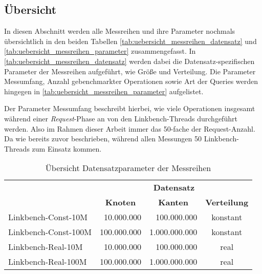 \subsection{Übersicht}
In diesen Abschnitt werden alle Messreihen und ihre Parameter nochmals übersichtlich in den beiden Tabellen \autoref{tab:uebersicht_messreihen_datensatz} und \autoref{tab:uebersicht_messreihen_parameter} zusammengefasst. In \autoref{tab:uebersicht_messreihen_datensatz} werden dabei die Datensatz-spezifischen Parameter der Messreihen aufgeführt, wie Größe und Verteilung. Die Parameter Messumfang, Anzahl gebenchmarkter Operationen sowie Art der Queries werden hingegen in \autoref{tab:uebersicht_messreihen_parameter} aufgelistet.

Der Parameter Messumfang beschreibt hierbei, wie viele Operationen insgesamt während einer \textit{Request}-Phase an von den Linkbench-Threads durchgeführt werden. Also im Rahmen dieser Arbeit immer das 50-fache der Request-Anzahl. Da wie bereits zuvor beschrieben, während allen Messungen 50 Linkbench-Threads zum Einsatz kommen. 

\begin{table}[!ht]
    \centering
    \begin{tabular}{l|r|r|c}
    \hline
    \rowcolor[HTML]{EFEFEF} 
    \multicolumn{1}{c|}{\cellcolor[HTML]{EFEFEF}{\color[HTML]{333333} }} & \multicolumn{3}{c}{\cellcolor[HTML]{EFEFEF}\textbf{Datensatz}} \\ \cline{2-4} 
    \rowcolor[HTML]{EFEFEF} 
    \multicolumn{1}{c|}{\multirow{-2}{*}{\cellcolor[HTML]{EFEFEF}{\color[HTML]{333333} \textbf{Messreihe}}}} & \multicolumn{1}{c|}{\cellcolor[HTML]{EFEFEF}\textbf{Knoten}} & \multicolumn{1}{c|}{\cellcolor[HTML]{EFEFEF}\textbf{Kanten}} & \multicolumn{1}{l}{\cellcolor[HTML]{EFEFEF}\textbf{Verteilung}} \\ \hline
    Linkbench-Const-10M & 10.000.000 & 100.000.000 & konstant \\
    Linkbench-Const-100M & 100.000.000 & 1.000.000.000 & konstant \\
    Linkbench-Real-10M & 10.000.000 & 100.000.000 & real \\
    Linkbench-Real-100M & 100.000.000 & 1.000.000.000 & real \\ \hline
    \end{tabular}
    \caption{Übersicht Datensatzparameter der Messreihen}
    \label{tab:uebersicht_messreihen_datensatz}
\end{table}

